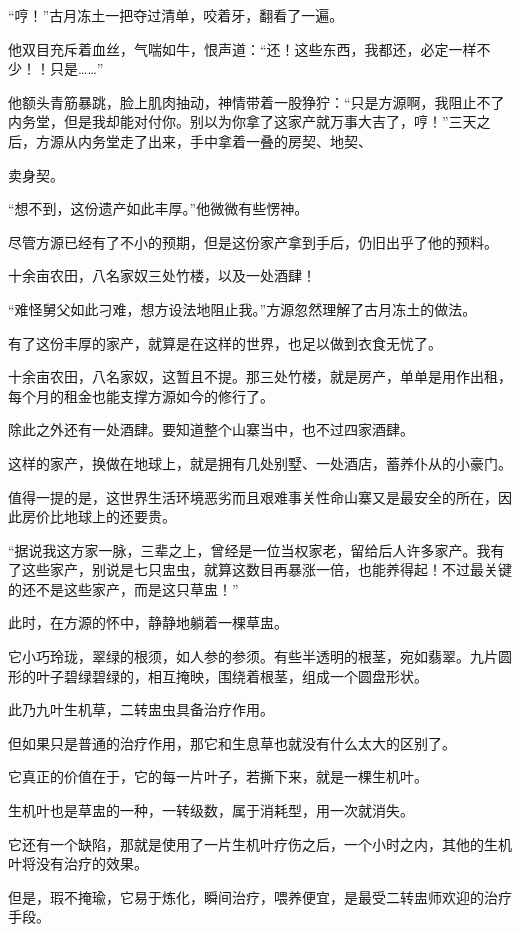 \begin{this_body}
“哼！”古月冻土一把夺过清单，咬着牙，翻看了一遍。

他双目充斥着血丝，气喘如牛，恨声道：“还！这些东西，我都还，必定一样不少！！只是……”

他额头青筋暴跳，脸上肌肉抽动，神情带着一股狰狞：“只是方源啊，我阻止不了内务堂，但是我却能对付你。别以为你拿了这家产就万事大吉了，哼！”三天之后，方源从内务堂走了出来，手中拿着一叠的房契、地契、

卖身契。

“想不到，这份遗产如此丰厚。”他微微有些愣神。

尽管方源已经有了不小的预期，但是这份家产拿到手后，仍旧出乎了他的预料。

十余亩农田，八名家奴三处竹楼，以及一处酒肆！

“难怪舅父如此刁难，想方设法地阻止我。”方源忽然理解了古月冻土的做法。

有了这份丰厚的家产，就算是在这样的世界，也足以做到衣食无忧了。

十余亩农田，八名家奴，这暂且不提。那三处竹楼，就是房产，单单是用作出租，每个月的租金也能支撑方源如今的修行了。

除此之外还有一处酒肆。要知道整个山寨当中，也不过四家酒肆。

这样的家产，换做在地球上，就是拥有几处别墅、一处酒店，蓄养仆从的小豪门。

值得一提的是，这世界生活环境恶劣而且艰难事关性命山寨又是最安全的所在，因此房价比地球上的还要贵。

“据说我这方家一脉，三辈之上，曾经是一位当权家老，留给后人许多家产。我有了这些家产，别说是七只盅虫，就算这数目再暴涨一倍，也能养得起！不过最关键的还不是这些家产，而是这只草盅！”

此时，在方源的怀中，静静地躺着一棵草盅。

它小巧玲珑，翠绿的根须，如人参的参须。有些半透明的根茎，宛如翡翠。九片圆形的叶子碧绿碧绿的，相互掩映，围绕着根茎，组成一个圆盘形状。

此乃九叶生机草，二转盅虫具备治疗作用。

但如果只是普通的治疗作用，那它和生息草也就没有什么太大的区别了。

它真正的价值在于，它的每一片叶子，若撕下来，就是一棵生机叶。

生机叶也是草盅的一种，一转级数，属于消耗型，用一次就消失。

它还有一个缺陷，那就是使用了一片生机叶疗伤之后，一个小时之内，其他的生机叶将没有治疗的效果。

但是，瑕不掩瑜，它易于炼化，瞬间治疗，喂养便宜，是最受二转盅师欢迎的治疗手段。


\end{this_body}
